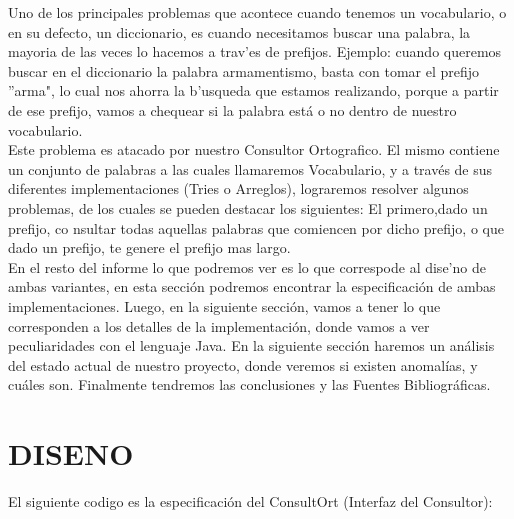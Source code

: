 \documentclass{article}
\begin{document}
 
  
       Uno de los principales problemas que acontece cuando tenemos un vocabulario, o en su defecto, un diccionario, es cuando necesitamos buscar una palabra, la mayoria de las veces lo hacemos a trav'es de prefijos. Ejemplo: cuando queremos buscar en el diccionario la palabra armamentismo, basta con tomar el prefijo ''arma", lo cual nos ahorra la b'usqueda que estamos realizando, porque a partir de ese prefijo, vamos a chequear si la palabra est\'a o no dentro de nuestro vocabulario.\\
       Este problema es atacado por nuestro Consultor Ortografico. El mismo contiene un conjunto de palabras a las cuales llamaremos Vocabulario, y a trav\'es de sus diferentes implementaciones (Tries o Arreglos), lograremos resolver algunos problemas, de los cuales se pueden destacar los siguientes: El primero,dado un prefijo, co nsultar todas aquellas palabras que comiencen por dicho prefijo, o que dado un prefijo, te genere el prefijo mas largo.\\
        En el resto del informe lo que podremos ver es lo que correspode al dise'no de ambas variantes, en esta secci\'on podremos encontrar la especificaci\'on de ambas implementaciones. Luego, en la siguiente secci\'on, vamos a tener lo que corresponden a los detalles de la implementaci\'on, donde vamos a ver peculiaridades con el lenguaje Java. En la siguiente secci\'on haremos un an\'alisis del estado actual de nuestro proyecto, donde veremos si existen anomal\'ias, y cu\'ales son. Finalmente tendremos las conclusiones y las Fuentes Bibliogr\'aficas.   



\newpage
\section{DISENO}

    El siguiente codigo es la especificaci\'on del ConsultOrt (Interfaz del Consultor):
\end{document}
